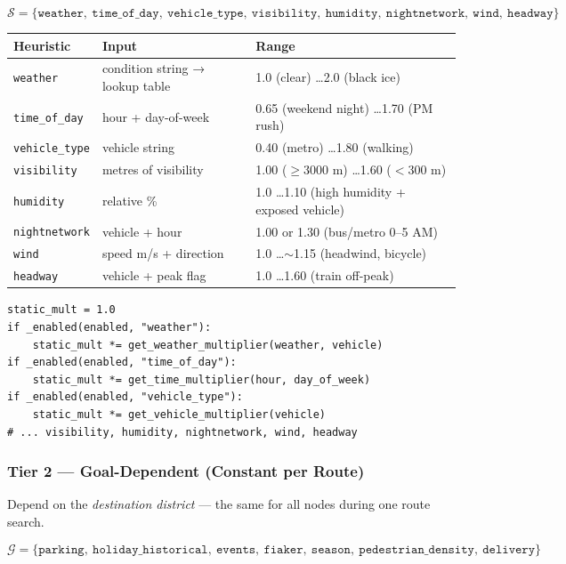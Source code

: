 \documentclass[11pt,a4paper]{article}
\begin{document}
\[
\mathcal{S} = \{\texttt{weather},\ \texttt{time\_of\_day},\ \texttt{vehicle\_type},\ \texttt{visibility},\ \texttt{humidity},\ \texttt{nightnetwork},\ \texttt{wind},\ \texttt{headway}\}
\]

\begin{table}[H]
\centering\small
\begin{tabular}{lll}
\toprule
\textbf{Heuristic} & \textbf{Input} & \textbf{Range} \\
\midrule
\texttt{weather} & condition string → lookup table & 1.0 (clear) \ldots 2.0 (black ice) \\
\texttt{time\_of\_day} & hour + day-of-week & 0.65 (weekend night) \ldots 1.70 (PM rush) \\
\texttt{vehicle\_type} & vehicle string & 0.40 (metro) \ldots 1.80 (walking) \\
\texttt{visibility} & metres of visibility & 1.00 ($\ge$3000 m) \ldots 1.60 ($<$300 m) \\
\texttt{humidity} & relative \% & 1.0 \ldots 1.10 (high humidity + exposed vehicle) \\
\texttt{nightnetwork} & vehicle + hour & 1.00 or 1.30 (bus/metro 0–5 AM) \\
\texttt{wind} & speed m/s + direction & 1.0 \ldots $\sim$1.15 (headwind, bicycle) \\
\texttt{headway} & vehicle + peak flag & 1.0 \ldots 1.60 (train off-peak) \\
\bottomrule
\end{tabular}
\end{table}

\begin{lstlisting}[caption={combined.py — static tier (computed once)}]
static_mult = 1.0
if _enabled(enabled, "weather"):
    static_mult *= get_weather_multiplier(weather, vehicle)
if _enabled(enabled, "time_of_day"):
    static_mult *= get_time_multiplier(hour, day_of_week)
if _enabled(enabled, "vehicle_type"):
    static_mult *= get_vehicle_multiplier(vehicle)
# ... visibility, humidity, nightnetwork, wind, headway
\end{lstlisting}

\subsubsection{Tier 2 — Goal-Dependent (Constant per Route)}

Depend on the \textit{destination district} — the same for all nodes during one route search.

\[
\mathcal{G} = \{\texttt{parking},\ \texttt{holiday\_historical},\ \texttt{events},\ \texttt{fiaker},\ \texttt{season},\ \texttt{pedestrian\_density},\ \texttt{delivery}\}
\]
\end{document}
